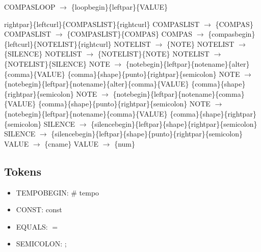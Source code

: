 COMPASLOOP $\rightarrow$ \{loopbegin\}\{leftpar\}\{VALUE\}\ {rightpar\}\{leftcurl\}\{COMPASLIST\}\{rightcurl\}\newline
COMPASLIST $\rightarrow$ \{COMPAS\}\newline
COMPASLIST $\rightarrow$ \{COMPASLIST\}\{COMPAS\}\newline
COMPAS $\rightarrow$ \{compasbegin\}\{leftcurl\}\{NOTELIST\}\{rightcurl\}\newline
NOTELIST $\rightarrow$ \{NOTE\}\newline
NOTELIST $\rightarrow$ \{SILENCE\}\newline
NOTELIST $\rightarrow$ \{NOTELIST\}\{NOTE\}\newline
NOTELIST $\rightarrow$ \{NOTELIST\}\{SILENCE\}\newline
NOTE $\rightarrow$ \{notebegin\}\{leftpar\}\{notename\}\{alter\}\{comma\}\{VALUE\} \{comma\}\{shape\}\{punto\}\{rightpar\}\{semicolon\}\newline
NOTE $\rightarrow$ \{notebegin\}\{leftpar\}\{notename\}\{alter\}\{comma\}\{VALUE\} \{comma\}\{shape\}\{rightpar\}\{semicolon\}\newline
NOTE $\rightarrow$ \{notebegin\}\{leftpar\}\{notename\}\{comma\}\{VALUE\} \{comma\}\{shape\}\{punto\}\{rightpar\}\{semicolon\}\newline
NOTE $\rightarrow$ \{notebegin\}\{leftpar\}\{notename\}\{comma\}\{VALUE\} \{comma\}\{shape\}\{rightpar\}\{semicolon\}\newline
SILENCE $\rightarrow$ \{silencebegin\}\{leftpar\}\{shape\}\{rightpar\}\{semicolon\}\newline
SILENCE $\rightarrow$ \{silencebegin\}\{leftpar\}\{shape\}\{punto\}\{rightpar\}\{semicolon\}\newline
VALUE $\rightarrow$ \{cname\}\newline
VALUE $\rightarrow$ \{num\}\newline

\subsection{Tokens}
\begin{itemize}
\item TEMPOBEGIN: \# tempo

\item CONST: const

\item EQUALS: $=$

\item SEMICOLON: ;


\end{itemize}}
